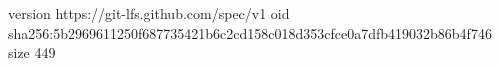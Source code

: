 version https://git-lfs.github.com/spec/v1
oid sha256:5b2969611250f687735421b6c2cd158c018d353cfce0a7dfb419032b86b4f746
size 449
